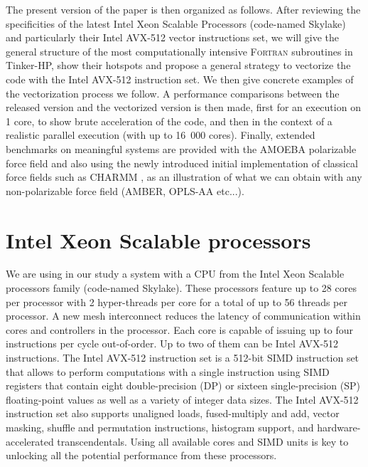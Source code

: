 \documentclass[9pt,comparison]{livecoms}
\begin{document}
The present version of the paper is then organized as follows.
After reviewing the specificities of the latest Intel Xeon Scalable Processors (code-named Skylake) and particularly their Intel AVX-512 vector instructions set, we will give the general structure of the most computationally intensive \textsc{Fortran} subroutines in Tinker-HP, show their hotspots and propose a general strategy to vectorize the code with the Intel AVX-512 instruction set. We then give concrete examples of the vectorization process we follow. A performance comparisons between the released version  and the vectorized version is then made, first for an execution on 1 core, to show brute acceleration of the code, and then in the context of a realistic parallel execution (with up to 16~000 cores). Finally, extended benchmarks on meaningful systems are provided with the AMOEBA polarizable force field \cite{ren2003polarizable,shi2013polarizable,zhang2018amoeba} and also using the newly introduced initial implementation of classical force fields such as CHARMM \cite{Charmm}, as an illustration of what we can obtain with any non-polarizable force field (AMBER,\cite{Amber} OPLS-AA\cite{jorgensen1996development} etc...).
\section{Intel Xeon Scalable processors}
\hspace{\parindent}We are using in our study a system with a CPU from the Intel Xeon Scalable processors family (code-named Skylake). These processors feature up to 28 cores per processor with 2 hyper-threads per core for a total of up to 56 threads per processor. A new mesh interconnect reduces the latency of communication within cores and controllers in the processor. Each core is capable of issuing up to four instructions per cycle out-of-order. Up to two of them can be Intel AVX-512 instructions\cite{intel-avx512}. The Intel AVX-512 instruction set is a 512-bit SIMD instruction set that allows to perform computations with a single instruction using SIMD registers that contain eight double-precision (DP) or sixteen single-precision (SP) floating-point values as well as a variety of integer data sizes. The Intel AVX-512 instruction set also supports unaligned loads, fused-multiply and add, vector masking, shuffle and permutation instructions, histogram support, and hardware-accelerated transcendentals. Using all available cores and SIMD units is key to unlocking all the potential performance from these processors.
\end{document}
